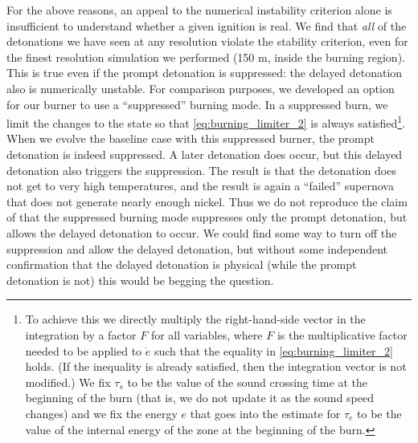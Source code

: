 \documentclass[twocolumn,numberedappendix]{../aastex62}
\begin{document}
For the above reasons, an appeal to the numerical instability criterion alone is
insufficient to understand whether a given ignition is real. We find that \textit{all}
of the detonations we have seen at any resolution violate the stability criterion,
even for the finest resolution simulation we performed (150 m, inside the burning region).
This is true even if the prompt detonation is suppressed:
the delayed detonation also is numerically unstable. For comparison purposes, we
developed an option for our burner to use a ``suppressed'' burning mode. In a
suppressed burn, we limit the changes to the state so that \autoref{eq:burning_limiter_2}
is always satisfied\footnote{To achieve this we directly multiply the
right-hand-side vector in the integration by a factor $F$
for all variables, where $F$ is the multiplicative factor needed to
be applied to $\dot{e}$ such that the equality in \autoref{eq:burning_limiter_2}
holds. (If the inequality is already satisfied, then the integration
vector is not modified.) We fix $\tau_s$ to be the value of the sound
crossing time at the beginning of the burn (that is, we do not
update it as the sound speed changes) and we fix the energy $e$
that goes into the estimate for $\tau_e$ to be the value of the
internal energy of the zone at the beginning of the burn.}. When we
evolve the baseline case with this suppressed burner, the prompt detonation
is indeed suppressed. A later detonation does occur, but this delayed
detonation also triggers the suppression. The result is that the detonation
does not get to very high temperatures, and the result is again a ``failed''
supernova that does not generate nearly enough nickel. Thus we do not
reproduce the claim of \citeauthor{kushnir:2013} that the suppressed
burning mode suppresses only the prompt detonation, but allows the
delayed detonation to occur. We could find some way to turn off the
suppression and allow the delayed detonation, but without some independent
confirmation that the delayed detonation is physical (while the prompt
detonation is not) this would be begging the question.
\end{document}

